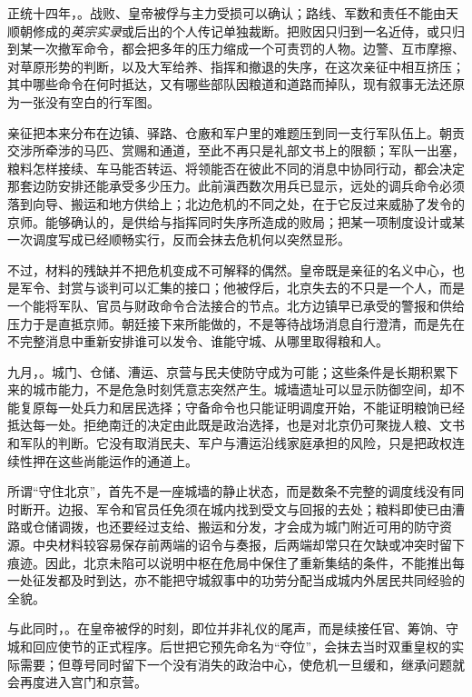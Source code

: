 正统十四年，。战败、皇帝被俘与主力受损可以确认；路线、军数和责任不能由天顺朝修成的\textit{英宗实录}或后出的个人传记单独裁断。把败因只归到一名近侍，或只归到某一次撤军命令，都会把多年的压力缩成一个可责罚的人物。边警、互市摩擦、对草原形势的判断，以及大军给养、指挥和撤退的失序，在这次亲征中相互挤压；其中哪些命令在何时抵达，又有哪些部队因粮道和道路而掉队，现有叙事无法还原为一张没有空白的行军图。

亲征把本来分布在边镇、驿路、仓廒和军户里的难题压到同一支行军队伍上。朝贡交涉所牵涉的马匹、赏赐和通道，至此不再只是礼部文书上的限额；军队一出塞，粮料怎样接续、车马能否转运、将领能否在彼此不同的消息中协同行动，都会决定那套边防安排还能承受多少压力。此前滇西数次用兵已显示，远处的调兵命令必须落到向导、搬运和地方供给上；北边危机的不同之处，在于它反过来威胁了发令的京师。能够确认的，是供给与指挥同时失序所造成的败局；把某一项制度设计或某一次调度写成已经顺畅实行，反而会抹去危机何以突然显形。

不过，材料的残缺并不把危机变成不可解释的偶然。皇帝既是亲征的名义中心，也是军令、封赏与谈判可以汇集的接口；他被俘后，北京失去的不只是一个人，而是一个能将军队、官员与财政命令合法接合的节点。北方边镇早已承受的警报和供给压力于是直抵京师。朝廷接下来所能做的，不是等待战场消息自行澄清，而是先在不完整消息中重新安排谁可以发令、谁能守城、从哪里取得粮和人。

九月，。城门、仓储、漕运、京营与民夫使防守成为可能；这些条件是长期积累下来的城市能力，不是危急时刻凭意志突然产生。城墙遗址可以显示防御空间，却不能复原每一处兵力和居民选择；守备命令也只能证明调度开始，不能证明粮饷已经抵达每一处。拒绝南迁的决定由此既是政治选择，也是对北京仍可聚拢人粮、文书和军队的判断。它没有取消民夫、军户与漕运沿线家庭承担的风险，只是把政权连续性押在这些尚能运作的通道上。

所谓“守住北京”，首先不是一座城墙的静止状态，而是数条不完整的调度线没有同时断开。边报、军令和官员任免须在城内找到受文与回报的去处；粮料即使已由漕路或仓储调拨，也还要经过支给、搬运和分发，才会成为城门附近可用的防守资源。中央材料较容易保存前两端的诏令与奏报，后两端却常只在欠缺或冲突时留下痕迹。因此，北京未陷可以说明中枢在危局中保住了重新集结的条件，不能推出每一处征发都及时到达，亦不能把守城叙事中的功劳分配当成城内外居民共同经验的全貌。

与此同时，。在皇帝被俘的时刻，即位并非礼仪的尾声，而是续接任官、筹饷、守城和回应使节的正式程序。后世把它预先命名为“夺位”，会抹去当时双重皇权的实际需要；但尊号同时留下一个没有消失的政治中心，使危机一旦缓和，继承问题就会再度进入宫门和京营。

